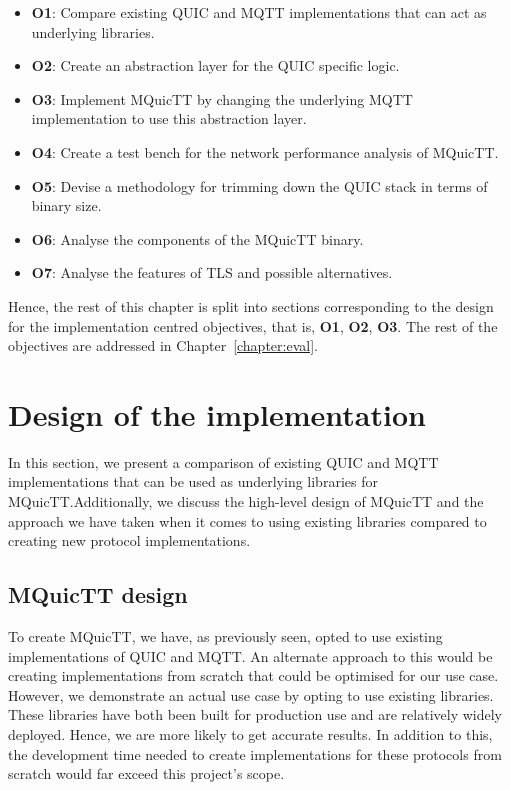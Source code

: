 \begin{itemize}
    \item \textbf{O1}: Compare existing QUIC and MQTT implementations that can act as underlying libraries.
    \item \textbf{O2}: Create an abstraction layer for the QUIC specific logic.
    \item \textbf{O3}: Implement MQuicTT by changing the underlying MQTT implementation to use this abstraction layer.
    \item \textbf{O4}: Create a test bench for the network performance analysis of MQuicTT.
    \item \textbf{O5}: Devise a methodology for trimming down the QUIC stack in terms of binary size.
    \item \textbf{O6}: Analyse the components of the MQuicTT binary.
    \item \textbf{O7}: Analyse the features of TLS and possible alternatives.
\end{itemize}

Hence, the rest of this chapter is split into sections corresponding to the design for the implementation centred objectives, that is, \textbf{O1}, \textbf{O2}, \textbf{O3}.
The rest of the objectives are addressed in Chapter~\ref{chapter:eval}.

\section{Design of the implementation}

In this section, we present a comparison of existing QUIC and MQTT implementations that can be used as underlying libraries for MQuicTT.Additionally, we discuss the high-level design of MQuicTT and the approach we have taken when it comes to using existing libraries compared to creating new protocol implementations.





\subsection{MQuicTT design}

To create MQuicTT, we have, as previously seen, opted to use existing implementations of QUIC and MQTT.
An alternate approach to this would be creating implementations from scratch that could be optimised for our use case.
However, we demonstrate an actual use case by opting to use existing libraries.
These libraries have both been built for production use and are relatively widely deployed.
Hence, we are more likely to get accurate results.
In addition to this, the development time needed to create implementations for these protocols from scratch would far exceed this project's scope.

